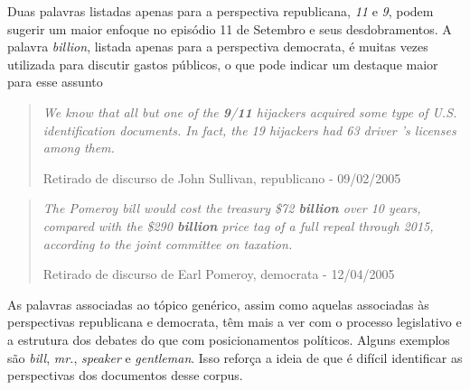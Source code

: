 Duas palavras listadas apenas para a perspectiva republicana, \emph{11} e \emph{9}, podem sugerir um maior enfoque no episódio 11 de Setembro e seus desdobramentos. A palavra \emph{billion}, listada apenas para a perspectiva democrata, é muitas vezes utilizada para discutir gastos públicos, o que pode indicar um destaque maior para esse assunto

\begin{quote}
\emph{We know that all but one of the \textbf{9}/\textbf{11} hijackers acquired some type of U.S. identification documents. In fact, the 19 hijackers had 63 driver 's licenses among them.}

{\small Retirado de discurso de John Sullivan, republicano - 09/02/2005} 
\end{quote}

\begin{quote}
\emph{The Pomeroy bill would cost the treasury \$72 \textbf{billion} over 10 years, compared with the \$290 \textbf{billion} price tag of a full repeal through 2015, according to the joint committee on taxation.}

{\small Retirado de discurso de Earl Pomeroy, democrata - 12/04/2005}
\end{quote}

As palavras associadas ao tópico genérico, assim como aquelas associadas às perspectivas republicana e democrata, têm mais a ver com o processo legislativo e a estrutura dos debates do que com posicionamentos políticos. Alguns exemplos são \emph{bill}, \emph{mr.}, \emph{speaker} e \emph{gentleman}. Isso reforça a ideia de que é difícil identificar as perspectivas dos documentos desse corpus. %

